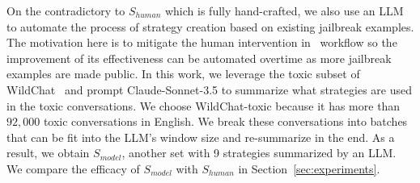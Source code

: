 On the contradictory to $S_{human}$ which is fully hand-crafted, we also use an LLM to automate the process of strategy creation based on existing jailbreak examples. The motivation here is to mitigate the human intervention in \methodname~workflow so the improvement of its effectiveness can be automated overtime as more jailbreak examples are made public. In this work, we leverage the toxic subset of WildChat~\cite{} and prompt Claude-Sonnet-3.5 to summarize what strategies are used in the toxic conversations. We choose WildChat-toxic because it has more than $92,000$ toxic conversations in English. We break these conversations into batches that can be fit into the LLM's window size and re-summarize in the end. As a result, we obtain $S_{model}$, another set with 9 strategies summarized by an LLM. We compare the efficacy of $S_{model}$ with $S_{human}$ in Section~\ref{sec:experiments}. 